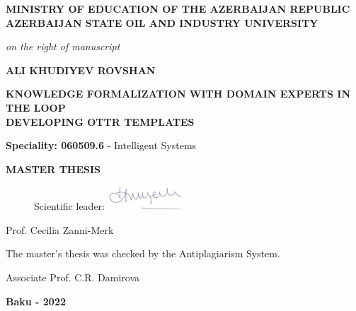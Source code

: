 \documentclass[14pt]{extreport}
\begin{document}
\begin{titlepage}
	\begin{center}
		\textbf{MINISTRY OF EDUCATION OF THE AZERBAIJAN REPUBLIC} \\ 
		\textbf{AZERBAIJAN STATE OIL AND INDUSTRY UNIVERSITY}
	\end{center}

	\hspace{9cm}
	\textit{on the right of manuscript}

	\vspace{1.5cm}

	\begin{center}
		\textbf{ALI KHUDIYEV ROVSHAN}
		
		\vspace{1.5cm}

		\textbf{KNOWLEDGE FORMALIZATION WITH DOMAIN EXPERTS IN THE LOOP} \\
		\textbf{DEVELOPING OTTR TEMPLATES}
	\end{center}

	\vspace{0.75cm}

	\textbf{Speciality: 060509.6} - Intelligent Systems

	\vspace{1.5cm}

	\begin{center}
		\textbf{MASTER THESIS}
	\end{center}

	\vspace{1.75cm}

	\begin{figure}[H]
		\centering
		\hspace{9cm}
		Scientific leader: 
		\includegraphics[width=0.25\textwidth]{Cecilia_signature.png}
	\end{figure}

	\hspace{9cm}
	Prof. Cecilia Zanni-Merk

	\vspace{1.25cm}

	The master's thesis was checked by the Antiplagiarism System.

	\hfill
	Associate Prof. C.R. Damirova

	\vfill

	\begin{center}
		\textbf{Baku - 2022}
	\end{center}
\end{titlepage}
\end{document}
